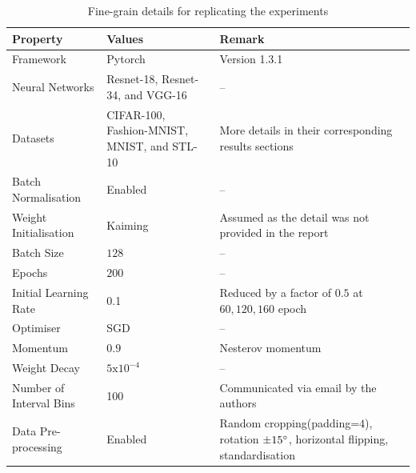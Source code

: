 \documentclass{article}
\begin{document}
\begin{table}[t]
\caption{Fine-grain details for replicating the experiments}\label{tab:details}
\begin{tabularx}{\textwidth}{XXX}
\toprule
Property & Values & Remark\\
\toprule
\rule{0pt}{1\normalbaselineskip}Framework & Pytorch & Version 1.3.1\\
\hline
\rule{0pt}{1\normalbaselineskip}Neural Networks & Resnet-18, Resnet-34, and VGG-16& --\\
\hline
\rule{0pt}{1\normalbaselineskip}Datasets & CIFAR-100, Fashion-MNIST, MNIST, and STL-10 & More details in their corresponding results sections\\
\hline
\rule{0pt}{1\normalbaselineskip}Batch Normalisation & Enabled & --\\
\hline
\rule{0pt}{1\normalbaselineskip}Weight Initialisation & Kaiming & Assumed as the detail was not provided in the report \\
\hline
\rule{0pt}{1\normalbaselineskip}Batch Size & $128$ & --\\
\hline
\rule{0pt}{1\normalbaselineskip}Epochs & $200$ & --\\
\hline
\rule{0pt}{1\normalbaselineskip}Initial Learning Rate & 0.1 & Reduced by a factor of $0.5$ at $60, 120, 160$ epoch\\
\hline
\rule{0pt}{1\normalbaselineskip}Optimiser & SGD & --\\
\hline
\rule{0pt}{1\normalbaselineskip}Momentum & $0.9$ & Nesterov momentum\\
\hline
\rule{0pt}{1\normalbaselineskip}Weight Decay & $5\text{x}10^{-4}$ & --\\
\hline
\rule{0pt}{1\normalbaselineskip}Number of Interval Bins & 100 & Communicated via email by the authors\\
\hline
\rule{0pt}{1\normalbaselineskip}Data Pre-processing & Enabled & Random cropping(padding=$4$), rotation $\SI{\pm 15}{}^\circ$, horizontal flipping, standardisation \\
\bottomrule
\end{tabularx}
\end{table}
\end{document}

